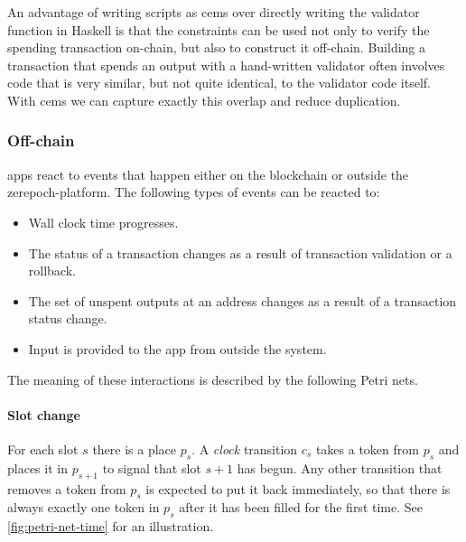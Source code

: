An advantage of writing \glspl{script} as \glspl{cem} over directly writing the \gls{validator} function in Haskell is that the constraints can be used not only to verify the spending transaction on-chain, but also to construct it off-chain.
Building a transaction that spends an output with a hand-written \gls{validator} often involves code that is very similar, but not quite identical, to the validator code itself.
With \glspl{cem} we can capture exactly this overlap and reduce duplication.

\subsubsection{Off-chain}

\glspl{app} react to events that happen either on the blockchain or outside the \gls{zerepoch-platform}.
The following types of events can be reacted to:
\begin{itemize}
  \item Wall clock time progresses.
  \item The status of a transaction changes as a result of transaction validation or a rollback.
  \item The set of unspent outputs at an address changes as a result of a transaction status change.
  \item Input is provided to the \gls{app} from outside the system.
\end{itemize}

The meaning of these interactions is described by the following Petri nets.

\paragraph{Slot change}

For each slot $s$ there is a place $p_s$.
A \emph{clock} transition $c_s$ takes a token from $p_s$ and places it in $p_{s+1}$ to signal that slot $s + 1$ has begun.
Any other transition that removes a token from $p_s$ is expected to put it back immediately, so that there is always exactly one token in $p_s$ after it has been filled for the first time. See \ref{fig:petri-net-time} for an illustration.

